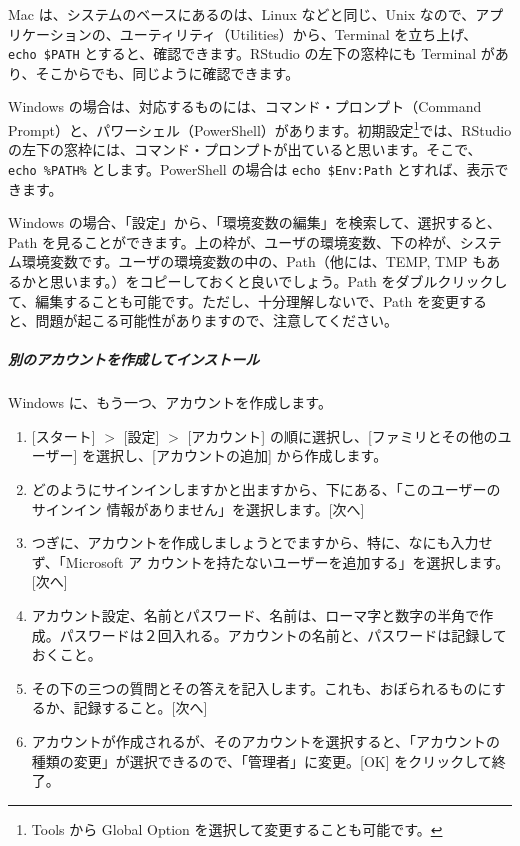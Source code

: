 \documentclass[
]{bxjsbook}
\theoremstyle{definition}
\theoremstyle{definition}
\theoremstyle{definition}
\theoremstyle{definition}
\theoremstyle{remark}
\begin{document}
Mac は、システムのベースにあるのは、Linux などと同じ、Unix なので、アプリケーションの、ユーティリティ（Utilities）から、Terminal を立ち上げ、
\texttt{echo\ \$PATH} とすると、確認できます。RStudio の左下の窓枠にも Terminal があり、そこからでも、同じように確認できます。

Windows の場合は、対応するものには、コマンド・プロンプト（Command Prompt）と、パワーシェル（PowerShell）があります。初期設定\footnote{Tools から Global Option を選択して変更することも可能です。}では、RStudio の左下の窓枠には、コマンド・プロンプトが出ていると思います。そこで、\texttt{echo\ \%PATH\%} とします。PowerShell の場合は \texttt{echo\ \$Env:Path} とすれば、表示できます。

Windows の場合、「設定」から、「環境変数の編集」を検索して、選択すると、Path を見ることができます。上の枠が、ユーザの環境変数、下の枠が、システム環境変数です。ユーザの環境変数の中の、Path（他には、TEMP, TMP もあるかと思います。）をコピーしておくと良いでしょう。Path をダブルクリックして、編集することも可能です。ただし、十分理解しないで、Path を変更すると、問題が起こる可能性がありますので、注意してください。

\hypertarget{ux5225ux306eux30a2ux30abux30a6ux30f3ux30c8ux3092ux4f5cux6210ux3057ux3066ux30a4ux30f3ux30b9ux30c8ux30fcux30eb}{%
\subparagraph{別のアカウントを作成してインストール}\label{ux5225ux306eux30a2ux30abux30a6ux30f3ux30c8ux3092ux4f5cux6210ux3057ux3066ux30a4ux30f3ux30b9ux30c8ux30fcux30eb}}

Windows に、もう一つ、アカウントを作成します。

\begin{enumerate}
\def\labelenumi{\arabic{enumi}.}
\item
  {[}スタート{]} \(>\) {[}設定{]} \(>\) {[}アカウント{]} の順に選択し、{[}ファミリとその他のユーザー{]} を選択し、{[}アカウントの追加{]} から作成します。
\item
  どのようにサインインしますかと出ますから、下にある、「このユーザーのサインイン
  情報がありません」を選択します。{[}次へ{]}
\item
  つぎに、アカウントを作成しましょうとでますから、特に、なにも入力せず、「Microsoft ア
  カウントを持たないユーザーを追加する」を選択します。{[}次へ{]}
\item
  アカウント設定、名前とパスワード、名前は、ローマ字と数字の半角で作成。パスワードは２回入れる。アカウントの名前と、パスワードは記録しておくこと。
\item
  その下の三つの質問とその答えを記入します。これも、おぼられるものにするか、記録すること。{[}次へ{]}
\item
  アカウントが作成されるが、そのアカウントを選択すると、「アカウントの種類の変更」が選択できるので、「管理者」に変更。{[}OK{]} をクリックして終了。
\end{enumerate}
\end{document}
